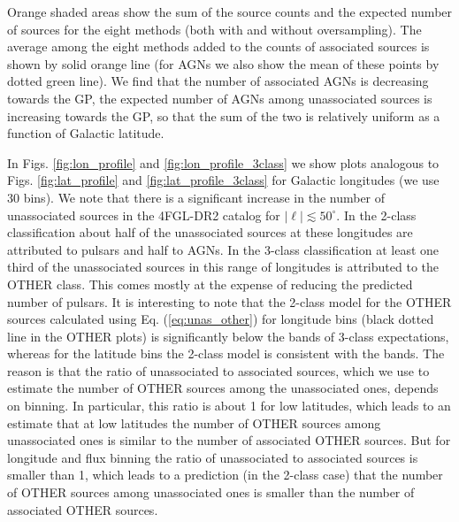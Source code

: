Orange shaded areas show the sum of the source counts and the expected number of sources for the eight methods (both with and without oversampling).
The average among the eight methods added to the counts of associated sources is shown by solid orange line 
(for AGNs we also show the mean of these points by dotted green line).
We find that the number of associated AGNs is decreasing towards the GP, the expected number of AGNs among unassociated sources is increasing towards the GP, so that the sum of the two is relatively uniform as a function of Galactic latitude.


In Figs. \ref{fig:lon_profile} and \ref{fig:lon_profile_3class} we show plots analogous to Figs. \ref{fig:lat_profile} and \ref{fig:lat_profile_3class} for Galactic longitudes (we use 30 bins).
We note that there is a significant increase in the number of unassociated sources in the 4FGL-DR2  catalog for $|\ell | \lesssim 50^\circ$.
In the 2-class classification about half of the unassociated sources at these longitudes are attributed to pulsars and half to AGNs.
In the 3-class classification at least one third of the unassociated sources in this range of longitudes is attributed to the OTHER class.
This comes mostly at the expense of reducing the predicted number of pulsars.
It is interesting to note that the 2-class model for the OTHER sources calculated using Eq. (\ref{eq:unas_other}) for longitude bins
(black dotted line in the OTHER plots) is significantly below the bands of 3-class expectations, whereas for the latitude bins the 2-class model
is consistent with the bands.
The reason is that the ratio of unassociated to associated sources, which we use to estimate the number of OTHER sources among the unassociated ones, depends on binning.
In particular, this ratio is about 1 for low latitudes, which leads to an estimate that at low latitudes the number of OTHER sources among unassociated ones is similar to the number of associated OTHER sources.
But for longitude and flux binning the ratio of unassociated to associated sources is smaller than 1, which leads to a prediction (in the 2-class case) that the number of OTHER sources among unassociated ones is smaller than the number of associated OTHER sources.

